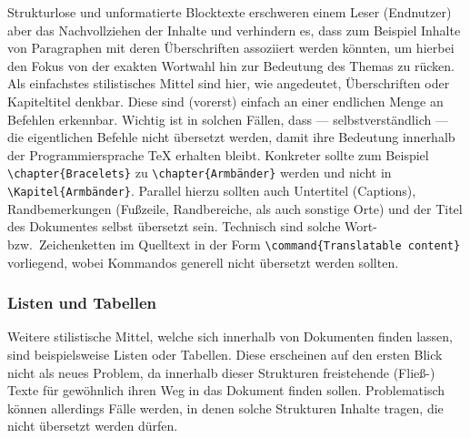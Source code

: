 Strukturlose und unformatierte Blocktexte erschweren einem Leser (Endnutzer) aber das Nachvollziehen der Inhalte und verhindern es, dass zum Beispiel Inhalte von Paragraphen mit deren Überschriften assoziiert werden könnten, um hierbei den Fokus von der exakten Wortwahl hin zur Bedeutung des Themas zu rücken.%
Als einfachstes stilistisches Mittel sind hier, wie angedeutet, Überschriften oder Kapiteltitel denkbar. Diese sind (vorerst) einfach an einer endlichen Menge an Befehlen erkennbar. Wichtig ist in solchen Fällen, dass --- selbstverständlich --- die eigentlichen Befehle nicht übersetzt werden, damit ihre Bedeutung innerhalb der Programmiersprache \TeX{} erhalten bleibt. Konkreter sollte zum Beispiel \verb|\chapter{Bracelets}| zu \verb|\chapter{Armbänder}| werden und nicht in \verb|\Kapitel{Armbänder}|.
Parallel hierzu sollten auch Untertitel (Captions), Randbemerkungen (Fußzeile, Randbereiche, als auch sonstige Orte) und der Titel des Dokumentes selbst übersetzt sein. Technisch sind solche Wort- bzw.\ Zeichenketten im Quelltext in der Form \verb|\command{Translatable content}| vorliegend, wobei Kommandos generell nicht übersetzt werden sollten.

\subsubsection{Listen und Tabellen}%
Weitere stilistische Mittel, welche sich innerhalb von Dokumenten finden lassen, sind beispielsweise Listen oder Tabellen. Diese erscheinen auf den ersten Blick nicht als neues Problem, da innerhalb dieser Strukturen freistehende (Fließ-) Texte für gewöhnlich ihren Weg in das Dokument finden sollen. Problematisch können allerdings Fälle werden, in denen solche Strukturen Inhalte tragen, die nicht übersetzt werden dürfen.  

